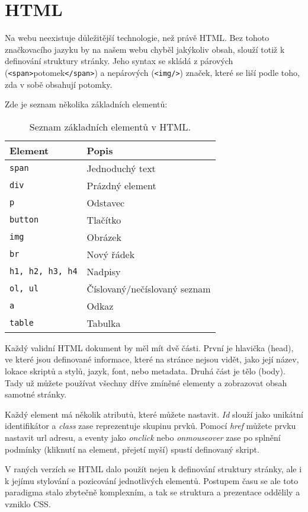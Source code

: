 \section{HTML}

Na webu neexistuje důležitější technologie, než právě HTML. Bez tohoto značkovacího jazyku by na našem webu chyběl jakýkoliv obsah, slouží totiž k definování struktury stránky. Jeho syntax se skládá z párových (\texttt{<span>}potomek\texttt{</span>}) a nepárových (\texttt{<img/>}) značek, které se liší podle toho, zda v sobě obsahují potomky.

Zde je seznam několika základních elementů:

\begin{table}[h!]
\centering
\begin{tabular}{|>{\centering\arraybackslash}m{4cm}|>{\centering\arraybackslash}m{5cm}|}
\hline
\textbf{Element} & \textbf{Popis} \\ \hline
\texttt{span} & Jednoduchý text \\ \hline
\texttt{div} & Prázdný element \\ \hline
\texttt{p} & Odstavec \\ \hline
\texttt{button} & Tlačítko \\ \hline
\texttt{img} & Obrázek \\ \hline
\texttt{br} & Nový řádek \\ \hline
\texttt{h1, h2, h3, h4} & Nadpisy \\ \hline
\texttt{ol, ul} & Číslovaný/nečíslovaný seznam \\ \hline
\texttt{a} & Odkaz \\ \hline
\texttt{table} & Tabulka \\ \hline
\end{tabular}
\caption{Seznam základních elementů v HTML.}
\end{table}

Každý validní HTML dokument by měl mít dvě části. První je hlavička (head), ve které jsou definované informace, které na stránce nejsou vidět, jako její název, lokace skriptů a stylů, jazyk, font, nebo metadata. Druhá část je tělo (body). Tady už můžete používat všechny dříve zmíněné elementy a zobrazovat obsah samotné stránky.

Každý element má několik atributů, které můžete nastavit. \textit{Id} slouží jako unikátní identifikátor a \textit{class} zase reprezentuje skupinu prvků. Pomocí \textit{href} můžete prvku nastavit url adresu, a eventy jako \textit{onclick} nebo \textit{onmouseover} zase po splnění podmínky (kliknutí na element, přejetí myší) spustí definovaný skript.

V raných verzích se HTML dalo použít nejen k definování struktury stránky, ale i k jejímu stylování a pozicování jednotlivých elementů. Postupem času se ale toto paradigma stalo zbytečně komplexním, a tak se struktura a prezentace oddělily a vzniklo CSS.